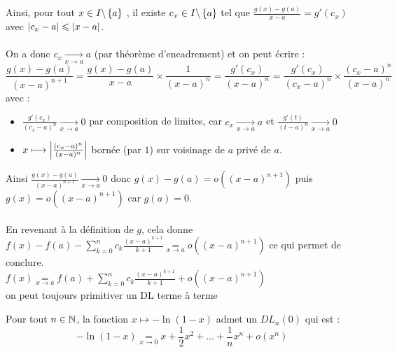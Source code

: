 \begin{dem}
Ainsi, pour tout \(x \in I \backslash \left\lbrace a\right\rbrace\) , il existe \(c_x \in I \backslash \left\lbrace a\right\rbrace\) tel que \(\frac{g(x) - g(a)}{x - a} = g' (c_x) \) avec \(\left\lvert c_x - a\right\rvert \leqslant \left\lvert x - a\right\rvert\).\\~\\
On a donc \(c_x \underset{x \to a}{ \to} a\) (par théorème d’encadrement) et on peut écrire :
\[\frac{g(x) - g(a)}{(x - a)^{n+1}} = \frac{g(x) - g(a)}{x - a} \times \frac{1}{(x - a)^n} = \frac{g' (c_x)}{(x - a)^n} = \frac{g' (c_x)}{(c_x - a)^n} \times \frac{(c_x - a)^n}{(x - a)^n}\]
avec :
\begin{itemize}
    \item \(\frac{g' (c_x)}{(c_x - a)^n} \underset{x \to a}{ \to} 0\) par composition de limites, car \(c_x \underset{x \to a}{ \to} a\) et \(\frac{g' (t)}{(t - a)^n} \underset{x \to a}{\to} 0\)
    \item \(x \longmapsto \left\lvert\frac{(c_x - a)^n}{(x - a)^n}\right\rvert\) bornée (par \(1\)) sur voisinage de \(a\) privé de \(a\).
\end{itemize}
Ainsi \(\frac{g(x) - g(a)}{(x - a)^{n+1}} \underset{x \to a}{ \to} 0\) donc \(g(x) - g(a) = o ((x - a)^{n+1})\) puis \(g(x) = o ((x - a)^{n+1})\) car \(g(a) = 0\).\\~\\
En revenant à la définition de \(g\), cela donne \(f (x) - f (a) -\sum^n_{k=0}c_k\frac{(x - a)^{k+1}}{k + 1} \underset{x \to a}{=} o ((x - a)^{n+1})\) ce qui permet de conclure.\\
\conclusion \(f (x) \underset{x \to a}{=} f (a) + \sum^n_{k=0}c_k\frac{(x - a)^{k+1}}{k + 1} + o ((x - a)^{n+1})\) \\
\ie on peut toujours primitiver un DL terme à terme
\end{dem}

\begin{defprop}
    Pour tout \(n \in  \mathbb{N}\), la fonction \(x \mapsto  - \ln(1 - x)\) admet un \(DL_n(0)\) qui est :
    \[- \ln(1 - x) \underset{x \to 0}{=} x + \frac{1}{2}x^2 + \dots + \frac{1}{n}x^n + o(x^n)\]
\end{defprop}

